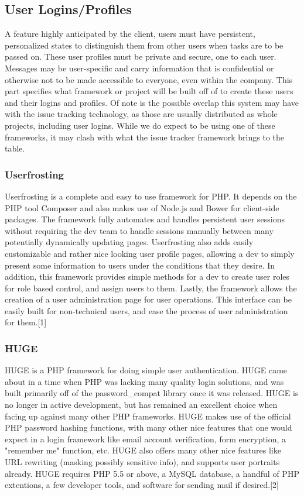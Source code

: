 \documentclass[onecolumn, draftclsnofoot,10pt, compsoc]{IEEEtran}
\begin{document}

\subsection{User Logins/Profiles}
A feature highly anticipated by the client, users must have persistent, personalized states to distinguish them from other users when tasks are to be 
passed on. These user profiles must be private and secure, one to each user. Messages may be user-specific and carry information that is confidential 
or otherwise not to be made accessible to everyone, even within the company. This part specifies what framework or project will be built off of to 
create these users and their logins and profiles. Of note is the possible overlap this system may have with the issue tracking technology, as those are 
usually distributed as whole projects, including user logins. While we do expect to be using one of these frameworks, it may clash with what the issue tracker 
framework brings to the table.
\subsubsection{Userfrosting}
Userfrosting is a complete and easy to use framework for PHP. It depends on the PHP tool Composer and also makes use of Node.js and Bower for client-side packages.
The framework fully automates and handles persistent user sessions without requiring the dev team to handle sessions manually between many potentially dynamically updating 
pages. Userfrosting also adds easily customizable and rather nice looking user profile pages, allowing a dev to simply present some information to users under the conditions 
that they desire. In addition, this framework provides simple methods for a dev to create user roles for role based control, and assign users to them. Lastly, the framework 
allows the creation of a user administration page for user operations. This interface can be easily built for non-technical users, and ease the process of user administration 
for them.[1]
\subsubsection{HUGE}
HUGE is a PHP framework for doing simple user authentication. HUGE came about in a time when PHP was lacking many quality login solutions, and was built
primarily off of the password\_compat library once it was released. HUGE is no longer in active development, but has remained an excellent choice when facing 
up against many other PHP frameworks. HUGE makes use of the official PHP password hashing functions, with many other nice features that one would expect in a 
login framework like email account verification, form encryption, a "remember me" function, etc. HUGE also offers many other nice features like URL rewriting 
(masking possibly sensitive info), and supports user portraits already. HUGE requires PHP 5.5 or above, a MySQL database, a handful of PHP extentions, a few 
developer tools, and software for sending mail if desired.[2]
\end{document}
